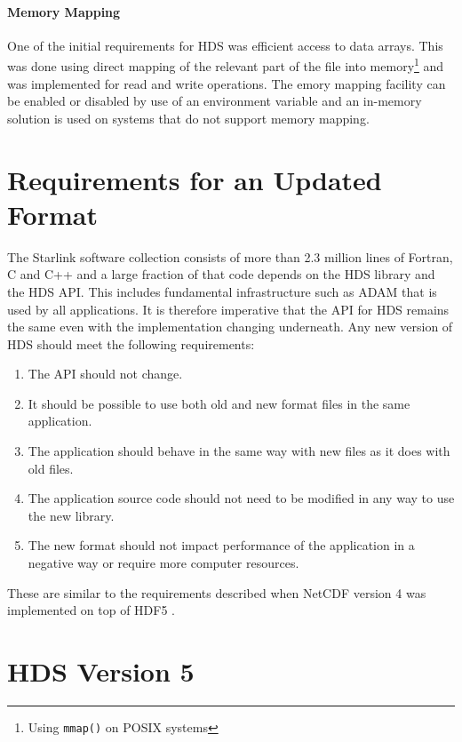 \documentclass[final,authoryear,5p,times,twocolumn]{elsarticle}
\begin{document}
\paragraph{Memory Mapping}

One of the initial requirements for HDS was efficient access to data
arrays. This was done using direct mapping of the relevant part of the
file into memory\footnote{Using \texttt{mmap()} on POSIX systems} and
was implemented for read and write operations. The emory mapping facility
can be enabled or disabled by use of an environment variable and an
in-memory solution is used on systems that do not support memory mapping.

\section{Requirements for an Updated Format}

The Starlink software collection consists of more than 2.3 million
lines of Fortran, C and C++ and a large fraction of that code depends
on the HDS library and the HDS API. This includes fundamental
infrastructure such as ADAM that is used by all applications. It is
therefore imperative that the API for HDS remains the same even with
the implementation changing underneath. Any new version of HDS should
meet the following requirements:

\begin{enumerate}
\item The API should not change.
\item It should be possible to use both old and new format files in
  the same application.
\item The application should behave in the same way with new files as
  it does with old files.
\item The application source code should not need to be modified in
  any way to use the new library.
\item The new format should not impact performance of the application
  in a negative way or require more computer resources.
\end{enumerate}

These are similar to the requirements described when NetCDF version 4
was implemented on top of HDF5 \citep{2004Rew}.

\section{HDS Version 5}
\end{document}
